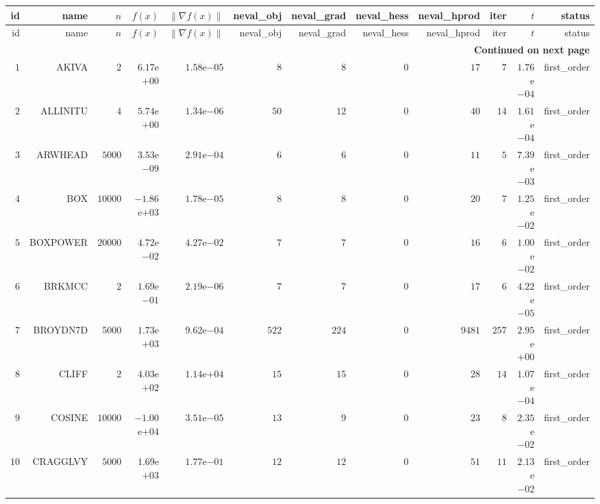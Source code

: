 \begin{longtable}{rrrrrrrrrrrr}
  \hline
  id & name & \(n\) & \(f(x)\) & \(\|\nabla f(x)\|\) & neval\_obj & neval\_grad & neval\_hess & neval\_hprod & iter & \(t\) & status \\\hline
  \endfirsthead
  \hline
  id & name & \(n\) & \(f(x)\) & \(\|\nabla f(x)\|\) & neval\_obj & neval\_grad & neval\_hess & neval\_hprod & iter & \(t\) & status \\\hline
  \endhead
  \hline
  \multicolumn{12}{r}{{\bfseries Continued on next page}}\\
  \hline
  \endfoot
  \endlastfoot
  \(     1\) & AKIVA & \(     2\) & \( 6.17\)e\(+00\) & \( 1.58\)e\(-05\) & \(     8\) & \(     8\) & \(     0\) & \(    17\) & \(     7\) & \( 1.76\)e\(-04\) & first\_order \\
  \(     2\) & ALLINITU & \(     4\) & \( 5.74\)e\(+00\) & \( 1.34\)e\(-06\) & \(    50\) & \(    12\) & \(     0\) & \(    40\) & \(    14\) & \( 1.61\)e\(-04\) & first\_order \\
  \(     3\) & ARWHEAD & \(  5000\) & \( 3.53\)e\(-09\) & \( 2.91\)e\(-04\) & \(     6\) & \(     6\) & \(     0\) & \(    11\) & \(     5\) & \( 7.39\)e\(-03\) & first\_order \\
  \(     4\) & BOX & \( 10000\) & \(-1.86\)e\(+03\) & \( 1.78\)e\(-05\) & \(     8\) & \(     8\) & \(     0\) & \(    20\) & \(     7\) & \( 1.25\)e\(-02\) & first\_order \\
  \(     5\) & BOXPOWER & \( 20000\) & \( 4.72\)e\(-02\) & \( 4.27\)e\(-02\) & \(     7\) & \(     7\) & \(     0\) & \(    16\) & \(     6\) & \( 1.00\)e\(-02\) & first\_order \\
  \(     6\) & BRKMCC & \(     2\) & \( 1.69\)e\(-01\) & \( 2.19\)e\(-06\) & \(     7\) & \(     7\) & \(     0\) & \(    17\) & \(     6\) & \( 4.22\)e\(-05\) & first\_order \\
  \(     7\) & BROYDN7D & \(  5000\) & \( 1.73\)e\(+03\) & \( 9.62\)e\(-04\) & \(   522\) & \(   224\) & \(     0\) & \(  9481\) & \(   257\) & \( 2.95\)e\(+00\) & first\_order \\
  \(     8\) & CLIFF & \(     2\) & \( 4.03\)e\(+02\) & \( 1.14\)e\(+04\) & \(    15\) & \(    15\) & \(     0\) & \(    28\) & \(    14\) & \( 1.07\)e\(-04\) & first\_order \\
  \(     9\) & COSINE & \( 10000\) & \(-1.00\)e\(+04\) & \( 3.51\)e\(-05\) & \(    13\) & \(     9\) & \(     0\) & \(    23\) & \(     8\) & \( 2.35\)e\(-02\) & first\_order \\
  \(    10\) & CRAGGLVY & \(  5000\) & \( 1.69\)e\(+03\) & \( 1.77\)e\(-01\) & \(    12\) & \(    12\) & \(     0\) & \(    51\) & \(    11\) & \( 2.13\)e\(-02\) & first\_order \\

\end{longtable}
